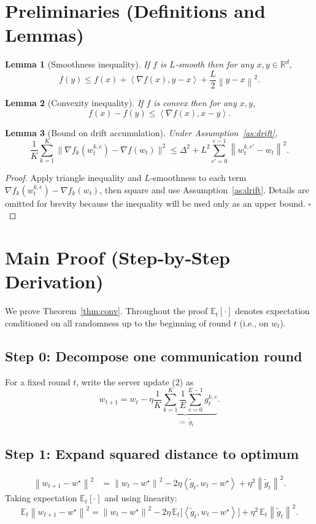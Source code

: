 \documentclass{article}
\newtheorem{lemma}{Lemma}
\newcommand{\E}{\mathbb{E}}
\newcommand{\R}{\mathbb{R}}
\newcommand{\norm}[1]{\left\|#1\right\|}
\newcommand{\inner}[2]{\left\langle #1,#2\right\rangle}
\begin{document}
\newpage
\section*{Preliminaries (Definitions and Lemmas)}
\begin{lemma}[Smoothness inequality]\label{lem:smooth}
If $f$ is $L$‑smooth then for any $x,y\in\R^d$,
\[
f(y)\le f(x)+\inner{\nabla f(x)}{y-x}+\frac{L}{2}\norm{y-x}^2 .
\tag{L1}
\]
\end{lemma}
\begin{lemma}[Convexity inequality]\label{lem:convex}
If $f$ is convex then for any $x,y$,
\[
f(x)-f(y)\le\inner{\nabla f(x)}{x-y}.
\tag{L2}
\]
\end{lemma}
\begin{lemma}[Bound on drift accumulation]\label{lem:drift}
Under Assumption~\ref{as:drift},
\[
\frac1K\sum_{k=1}^K\big\|\nabla f_k(w_{t}^{k,e})-\nabla f(w_t)\big\|^2
\le \Delta^2 + L^2\sum_{e'=0}^{e-1}\norm{w_{t}^{k,e'}-w_t}^2 .
\tag{L3}
\]
\end{lemma}
\begin{proof}
Apply triangle inequality and $L$‑smoothness to each term $\nabla f_k(w_{t}^{k,e})-\nabla f_k(w_t)$, then square and use Assumption~\ref{as:drift}.  Details are omitted for brevity because the inequality will be used only as an upper bound. \hfill $\square$
\end{proof}

\section*{Main Proof (Step‑by‑Step Derivation)}
We prove Theorem~\ref{thm:conv}.  Throughout the proof $\E_t[\cdot]$ denotes expectation conditioned on all randomness up to the beginning of round $t$ (i.e., on $w_t$).

\subsection*{Step 0: Decompose one communication round}
For a fixed round $t$, write the server update (2) as
\[
w_{t+1}=w_t-\eta\underbrace{\frac1{K}\sum_{k=1}^K\frac1E\sum_{e=0}^{E-1} g_{t}^{k,e}}_{:=\; \widetilde g_t}.
\tag{5}
\]

\subsection*{Step 1: Expand squared distance to optimum}
\[
\begin{aligned}
\norm{w_{t+1}-w^\star}^2
&= \norm{w_t-w^\star}^2
-2\eta\inner{\widetilde g_t}{w_t-w^\star}
+\eta^2\norm{\widetilde g_t}^2 .
\end{aligned}
\tag{6}
\]
Taking expectation $\E_t[\cdot]$ and using linearity:
\[
\E_t\norm{w_{t+1}-w^\star}^2
= \norm{w_t-w^\star}^2
-2\eta\,\E_t\!\big[\inner{\widetilde g_t}{w_t-w^\star}\big]
+\eta^2\,\E_t\norm{\widetilde g_t}^2 .
\tag{7}
\]
\end{document}
